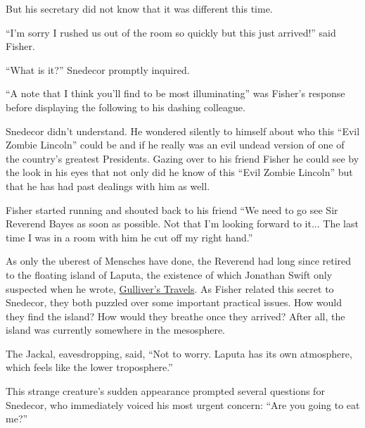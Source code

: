 \documentclass{article}
\begin{document}
But his secretary did not know that it was different this time.


``I'm sorry I rushed us out of the room so quickly but this just arrived!'' said Fisher. 

``What is it?'' Snedecor promptly inquired.

``A note that I think you'll find to be most illuminating'' was Fisher's response before displaying the following to his dashing colleague.

\Fontauri
\large 
\begin{center}
\end{center}

\normalfont
\normalsize
\vspace{.5in}

Snedecor didn't understand.  He wondered silently to himself about who this ``Evil Zombie Lincoln'' could be and if he really was an evil undead version of one of the country's greatest Presidents.  Gazing over to his friend Fisher he could see by the look in his eyes that not only did he know of this ``Evil Zombie Lincoln'' but that he has had past dealings with him as well.

Fisher started running and shouted back to his friend ``We need to go see Sir Reverend Bayes as soon as possible.  Not that I'm looking forward to it... The last time I was in a room with him he cut off my right hand.''


As only the uberest of Mensches have done, the Reverend had long since retired to the floating island of Laputa, the existence of which Jonathan Swift only suspected when he wrote, \underline{Gulliver's Travels}. As Fisher related this secret to Snedecor, they both puzzled over some important practical issues. How would they find the island? How would they breathe once they arrived? After all, the island was currently somewhere in the mesosphere. 

The Jackal, eavesdropping, said, ``Not to worry. Laputa has its own atmosphere, which feels like the lower troposphere.'' 

This strange creature's sudden appearance prompted several questions for Snedecor, who immediately voiced his most urgent concern: ``Are you going to eat me?'' 
\end{document}
